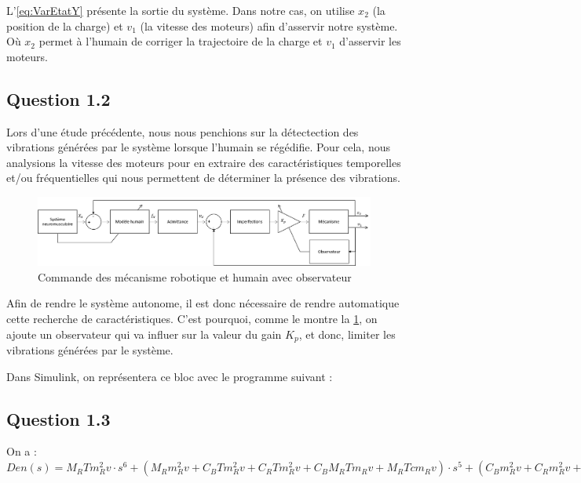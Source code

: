 \documentclass[a4paper,11pt]{article}
\begin{document}
L'\autoref{eq:VarEtatY} présente la sortie du système. Dans notre cas, on utilise $x_2$ (la position de la charge) et $v_1$ (la vitesse des moteurs) afin d'asservir notre système. Où $x_2$ permet à l'humain de corriger la trajectoire de la charge et $v_1$ d'asservir les moteurs.


\subsection{Question 1.2}
Lors d'une étude précédente, nous nous penchions sur la détectection des vibrations générées par le système lorsque l'humain se régédifie. Pour cela, nous analysions la vitesse des moteurs pour en extraire des caractéristiques temporelles et/ou fréquentielles qui nous permettent de déterminer la présence des vibrations. \\

\begin{figure}[h!]
    \centering
    \includegraphics[width=16cm]{./img/SchemaBlocAvecObs.png}
    \caption{Commande des mécanisme robotique et humain avec observateur\label{fig:SchemaBlocAvecObs}}
\end{figure}

Afin de rendre le système autonome, il est donc nécessaire de rendre automatique cette recherche de caractéristiques. C'est pourquoi, comme le montre la \ref{fig:SchemaBlocAvecObs}, on ajoute un observateur qui va influer sur la valeur du gain $K_p$, et donc, limiter les vibrations générées par le système.

Dans Simulink, on représentera ce bloc avec le programme suivant :


\subsection{Question 1.3}
On a : \\
$Den(s)=M_R T m_R^2 v \cdot s^6 + (M_R m_R^2 v + C_B T m_R^2 v + C_R T m_R^2 v + C_B M_R T m_R v + M_R T c m_R v) \cdot s^5 + (C_B m_R^2 v + C_R m_R^2 v + K_B T m_R^2 v + C_B M_R m_R v + K_p M_R m_R v + M_R c m_R v + C_B M_R T c v + C_B C_R T m_R v + K_B M_R T m_R v + C_B T c m_R v + C_R T c m_R v) \cdot s^4 + (K_B m_R^2 v + C_B M_R c v + C_B C_R m_R v + C_B K_p m_R v + K_p M_R c v + C_R K_p m_R v + K_B M_R m_R v + C_B c m_R v + C_R c m_R v + C_B C_R T c v + K_B M_R T c v + C_R K T m_R v + K_B T c m_R v) \cdot s^3 + (C_B C_R c v + C_B K_p c v + C_R K_p c v + K_B M_R c v + C_R K m_R v + K K_p m_R v + K c m_R v + C_R K T c v) \cdot s^2 + (C_B K_h K_p + C_R K c v + K K_p c v) \cdot s + K_B K_h K_p$
\\
\end{document}
